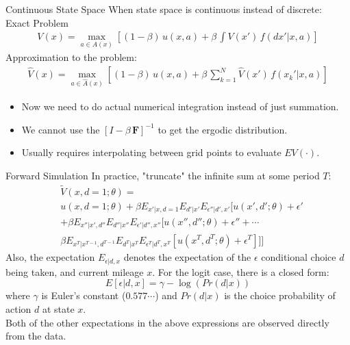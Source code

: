\documentclass[xcolor=pdftex,dvipsnames,table,mathserif,aspectratio=169]{beamer}
\begin{document}
\begin{frame}{Continuous State Space}
When state space is continuous instead of discrete:\\
Exact Problem
\begin{align*}
V(x) = \max_{a \in A(x)} \left[ (1-\beta)\, u(x,a) + \beta \, \int V(x')\, f(dx' | x,a) \right]
\end{align*}
Approximation to the problem:
\begin{align*}
\hat{V}(x) = \max_{a \in \hat{A}(x)} \left[ (1-\beta) \, u(x,a) + \beta \, \sum_{k=1}^N \hat{V}(x') \, f (x_k' | x,a) \right]
\end{align*}
\begin{itemize}
\item Now we need to do actual numerical integration instead of just summation.
\item We cannot use the $[I- \beta \, \mathbf{F}]^{-1}$ to get the ergodic distribution.
\item Usually requires interpolating between grid points to evaluate $EV(\cdot)$.
\end{itemize}
\end{frame}


\begin{frame}{Forward Simulation}
In practice, "truncate" the infinite sum at some period $T$: 
\begin{align*} 
& \tilde V(x, d=1;\theta) =\\
& u(x, d=1; \theta) + \beta E_{x'|x, d=1} E_{d'|x'} E_{\epsilon''|d', x'} [u(x', d';\theta) + \epsilon' \\
& + \beta E_{x''|x', d''} E_{d''|x''} E_{\epsilon'|d'', x''} [u(x'', d'';\theta) + \epsilon'' + \cdots \\
& \beta E_{x^T|x^{T-1}, d^{T-1}} E_{d^T|x^T} E_{\epsilon^T|d^T, x^T} [u(x^T, d^T;\theta) + \epsilon^T ]]]
\end{align*}
Also, the expectation $E_{\epsilon|d, x}$ denotes the expectation of the $\epsilon$ conditional choice $d$ being taken, and current mileage $x$. For the logit case, there is a closed form:
$$ E[\epsilon | d, x] = \gamma - \log(Pr(d|x))$$
where $\gamma$ is Euler's constant ($0.577\cdots$) and $Pr(d|x)$ is the choice probability of action $d$ at state $x$. \\
\vspace{2mm}
Both of the other expectations in the above expressions are observed directly from the data. 
\end{frame}
\end{document}
